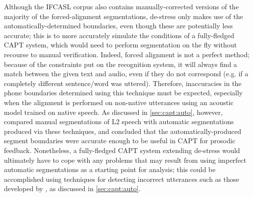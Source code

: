 	
	
	Although the IFCASL corpus also contains manually-corrected versions of the majority of the forced-alignment segmentations,
	de-stress only makes use of the automatically-determined boundaries, even though these are potentially less accurate; 
	this is to more accurately 
	simulate the conditions of a 
	fully-fledged CAPT system,
	which 
	would need to perform segmentation on the fly without recourse to manual verification.
	Indeed, 
	forced alignment is not a perfect method; because of the constraints put on the recognition system, it will always find a match between the given text and audio, even if they do not correspond (e.g. if a completely different sentence/word was uttered).  
	Therefore, inaccuracies in the phone boundaries determined using this technique must be expected, especially when the alignment is performed on non-native utterances using an acoustic model trained on native speech.
	As discussed in \cref{sec:capt:auto}, however, \textcite{Mesbahi2011} compared manual segmentations of L2 speech with automatic segmentations produced via these techniques, and concluded that the automatically-produced segment boundaries were accurate enough to be useful in CAPT for prosodic feedback.
		Nonetheless, a fully-fledged CAPT system extending de-stress would ultimately have to cope with any problems that may result from using imperfect automatic segmentations as a starting point for analysis; this could be accomplished using techniques for detecting incorrect utterances such as those developed by \textcite{Bonneau2012,Orosanu2012}, as discussed in \cref{sec:capt:auto}.
	
